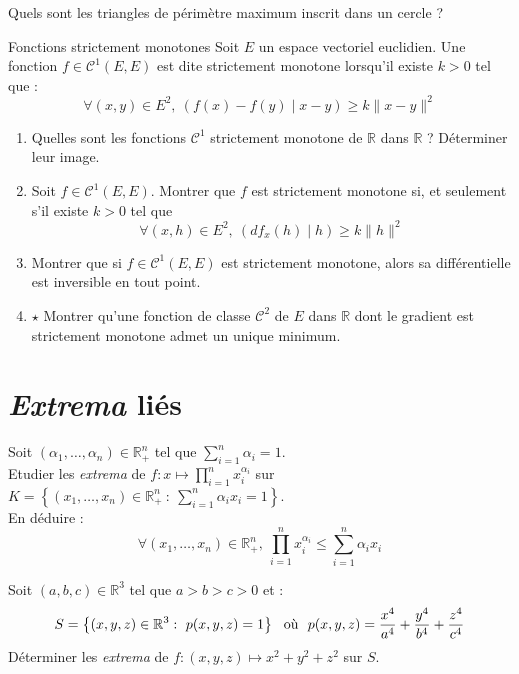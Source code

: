 \documentclass[french,a4paper]{article}
\newcommand{\R}{\mathbb{R}}
\theoremstyle{plain}
\theoremstyle{definition}
\theoremstyle{remark}
\begin{document}
\begin{ex}[Moulin.42]{}
	Quels sont les triangles de périmètre maximum inscrit dans un cercle ?
\end{ex}

\begin{ex}[Moulin.42]{Fonctions strictement monotones}
	Soit $E$ un espace vectoriel euclidien. Une fonction $f\in\mathcal{C}^1(E,E)$ est dite strictement monotone lorsqu'il existe $k>0$ tel que : $$\forall (x,y)\in E^2,\ \left(f(x)-f(y)\mid x-y\right)\geqslant k\lVert x-y\rVert^2$$
	\begin{enumerate}
		\item Quelles sont les fonctions $\mathcal{C}^1$ strictement monotone de $\R$ dans $\R$ ? Déterminer leur image.
		\item Soit $f\in\mathcal{C}^1(E,E)$. Montrer que $f$ est strictement monotone si, et seulement s'il existe $k>0$ tel que $$\forall (x,h)\in E^2,\ \left(df_x(h)\mid h\right)\geqslant k\lVert h\rVert^2$$
		\item Montrer que si $f\in\mathcal{C}^1(E,E)$ est strictement monotone, alors sa différentielle est inversible en tout point.
		\item $\star$ Montrer qu'une fonction de classe $\mathcal{C}^2$ de $E$ dans $\R$ dont le gradient est strictement monotone admet un unique minimum.
	\end{enumerate}
\end{ex}

\section{\textit{Extrema} liés}

\begin{ex}[Moulin.44]{}
	Soit $(\alpha_1,\ldots,\alpha_n)\in\R_+^n$ tel que $\displaystyle\sum_{i=1}^{n}\alpha_i=1$. \\
	Etudier les \textit{extrema} de $f:x\mapsto\displaystyle\prod_{i=1}^{n}x_i^{\alpha_i}$ sur $K=\displaystyle\left\{(x_1,\ldots,x_n)\in\R_+^n\ : \ \sum_{i=1}^{n}\alpha_ix_i=1\right\}$. \\
	En déduire : $$\forall (x_1,\ldots,x_n)\in\R_+^n,\ \prod_{i=1}^{n}x_i^{\alpha_i}\leqslant\sum_{i=1}^{n}\alpha_ix_i$$
\end{ex}

\begin{ex}[Moulin.45]{}
	Soit $(a,b,c)\in\R^3$ tel que $a>b>c>0$ et : $$S=\left\{(x,y,z)\in\R^3\\ : \ p(x,y,z)=1\right\}\ \ \text{où}\ \ p(x,y,z)=\frac{x^4}{a^4}+\frac{y^4}{b^4}+\frac{z^4}{c^4}$$ Déterminer les \textit{extrema} de $f:(x,y,z)\mapsto x^2+y^2+z^2$ sur $S$.
\end{ex}
\end{document}
